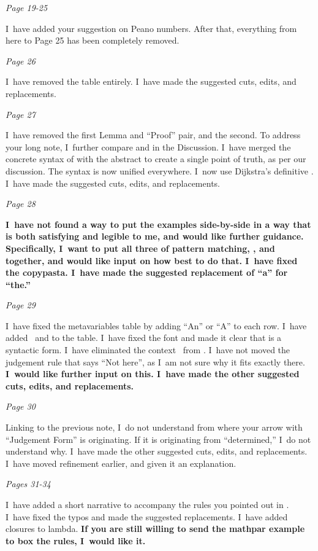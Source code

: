 \documentclass[manuscript,screen, 12pt, nonacm]{acmart}
\begin{document}
\it{Page 19-25}

I~have added your suggestion on Peano numbers. After that, everything from here
to Page 25 has been completely removed. 

\it{Page 26} 

I~have removed the table entirely. I~have made the suggested cuts, edits, and
replacements. 

\it{Page 27} 

I~have removed the first Lemma and “Proof” pair, and the second. To address your
long note, I~further compare \VMinus and \VC in the Discussion. I~have merged
the concrete syntax of \VMinus with the abstract to create a single point of
truth, as per our discussion. The syntax is now unified everywhere. I~now use
Dijkstra's definitive \dbar. I~have made the suggested cuts, edits, and
replacements. 

\it{Page 28} 

\bf{I~have not found a way to put the examples side-by-side in a way that is
both satisfying and legible to me, and would like further guidance.}
Specifically, I~want to put all three of pattern matching, \VC, and \VMinus
together, and would like input on how best to do that. I~have fixed the
copypasta. I~have made the suggested replacement of “a” for “the.”

\it{Page 29} 

I~have fixed the metavariables table by adding “An” or “A” to each row. I~have
added \Gs~and \gs to the table. I~have fixed the font and made it clear that
\fail is a syntactic form. I~have eliminated the context~\; from
\VMinus. I~have not moved the judgement rule that says “Not here”, as I~am not
sure why it fits exactly there. \bf{I~would like further input on this.} I~have made
the other suggested cuts, edits, and replacements. 

\it{Page 30} 

Linking to the previous note, I~do not understand from where your arrow with
“Judgement Form” is originating. If it is originating from “determined,” I~do
not understand why. I~have made the other suggested cuts, edits, and
replacements. I~have moved refinement earlier, and given it an explanation. 

\it{Pages 31-34} 

I~have added a short narrative to accompany the rules you pointed out in
\VMinus. I~have fixed the typos and made the suggested replacements. I~have
added closures to lambda. \bf{If you are still willing to send the mathpar example
to box the rules, I~would like it.}
\end{document}
